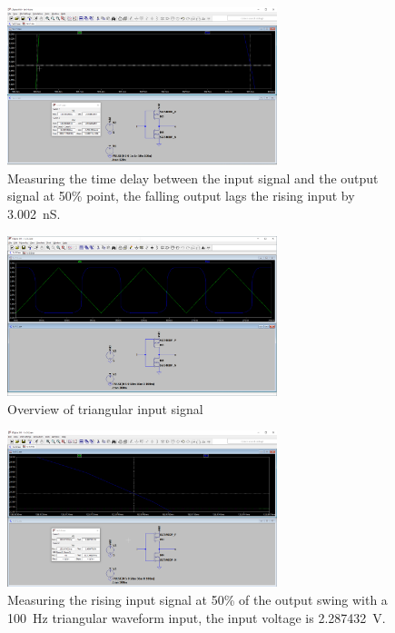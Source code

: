 \documentclass{article}
\begin{document}
	\begin{figure}[H]
	    \centering
	    \includegraphics[width=0.7\textwidth]{1a-3-3-sim}
	    \caption[Measuring the falling output time delay]{Measuring the time delay between the input signal and the output signal at 50\% point, the falling output lags the rising input by \SI{3.002}{nS}.}
	\end{figure}
	
	\begin{figure}[H]
	    \centering
	    \includegraphics[width=0.7\textwidth]{1a-3-4-sim}
	    \caption{Overview of triangular input signal}
	\end{figure}
	
	\begin{figure}[H]
	    \centering
	    \includegraphics[width=0.7\textwidth]{1a-3-5-sim}
	    \caption[Measuring the rising input signal]{Measuring the rising input signal at 50\% of the output swing with a \SI{100}{Hz} triangular waveform input, the input voltage is \SI{2.287432}{V}.}
	\end{figure}
	
\end{document}
